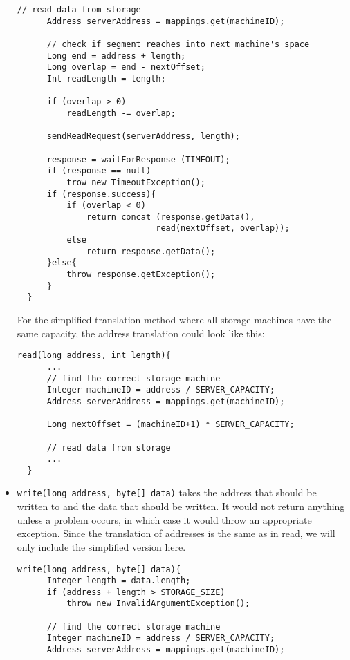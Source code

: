 \documentclass[12pt,a4paper]{article}
\begin{document}
\begin{itemize}
\begin{lstlisting}[basicstyle=\footnotesize]
      // read data from storage
      Address serverAddress = mappings.get(machineID);
      
      // check if segment reaches into next machine's space
      Long end = address + length;
      Long overlap = end - nextOffset;
      Int readLength = length;
      
      if (overlap > 0)
          readLength -= overlap;
      
      sendReadRequest(serverAddress, length);
      
      response = waitForResponse (TIMEOUT);
      if (response == null)
          trow new TimeoutException();
      if (response.success){
          if (overlap < 0)
              return concat (response.getData(),
                            read(nextOffset, overlap));
          else
              return response.getData();
      }else{
          throw response.getException();
      }
  }
  \end{lstlisting}
  
  For the simplified translation method where all storage machines have the same capacity, the address translation could look like this:
  \begin{lstlisting}[basicstyle=\footnotesize]
  read(long address, int length){ 
      ...
      // find the correct storage machine     
      Integer machineID = address / SERVER_CAPACITY;
      Address serverAddress = mappings.get(machineID);
      
      Long nextOffset = (machineID+1) * SERVER_CAPACITY;
      
      // read data from storage
      ...
  }
  \end{lstlisting}
  
  \item \texttt{write(long address, byte[] data)} takes the address that should be written to and the data that should be written. It would not return anything unless a problem occurs, in which case it would throw an appropriate exception. Since the translation of addresses is the same as in read, we will only include the simplified version here.
  
  \begin{lstlisting}[basicstyle=\footnotesize]
  write(long address, byte[] data){
      Integer length = data.length;
      if (address + length > STORAGE_SIZE)
          throw new InvalidArgumentException();
          
      // find the correct storage machine     
      Integer machineID = address / SERVER_CAPACITY;
      Address serverAddress = mappings.get(machineID);
      

\end{lstlisting}
\end{itemize}
\end{document}

